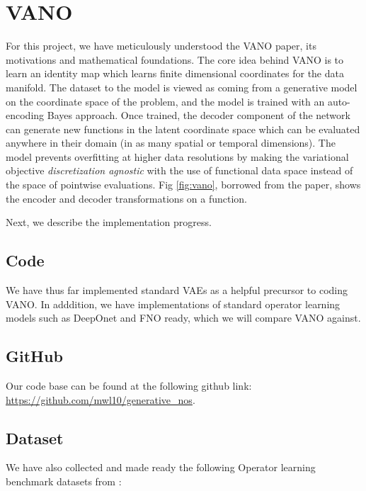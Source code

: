 \documentclass[11pt, fullpage,letterpaper]{article}
\begin{document}
\section{VANO}

For this project, we have meticulously understood the VANO paper, its motivations and mathematical foundations. The core idea behind VANO is to learn an identity map which learns finite dimensional coordinates for the data manifold. The dataset to the model is viewed as coming from a generative model on the coordinate space of the problem, and the model is trained with an auto-encoding Bayes approach. Once trained, the decoder component of the network can generate new functions in the latent coordinate space which can be evaluated anywhere in their domain (in as many spatial or temporal dimensions). The model prevents overfitting at higher data resolutions by making the variational objective \textit{discretization agnostic} with the use of functional data space instead of the space of pointwise evaluations. Fig \ref{fig:vano}, borrowed from the paper, shows the encoder and decoder transformations on a function.

Next, we describe the implementation progress.

\subsection{Code}

We have thus far implemented standard VAEs as a helpful precursor to coding VANO. In adddition, we have implementations of standard operator learning models such as DeepOnet and FNO ready, which we will compare VANO against. 

\subsection{GitHub}
Our code base can be found at the following github link: \url{https://github.com/mwl10/generative_nos}. 

\subsection{Dataset}
\label{sec:dataset}

We have also collected and made ready the following Operator learning benchmark datasets from \cite{fair_paper}:
\end{document}
